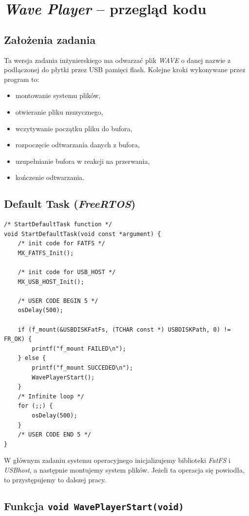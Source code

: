 \documentclass[12pt,a4paper]{article}
\begin{document}
\section{\emph{Wave Player} -- przegląd kodu}

\subsection{Założenia zadania}
Ta wersja zadania inżynierskiego ma odwarzać plik \emph{WAVE} o danej nazwie z podłączonej do płytki przez USB pamięci flash. Kolejne kroki wykonywane przez program to:
\begin{itemize}
 \item montowanie systemu plików,
 \item otwieranie pliku muzycznego,
 \item wczytywanie początku pliku do bufora,
 \item rozpoczęcie odtwarzania danych z bufora,
 \item uzupełnianie bufora w reakcji na przerwania,
 \item kończenie odtwarzania.
\end{itemize}

\subsection{Default Task (\emph{FreeRTOS})}

\begin{lstlisting}
/* StartDefaultTask function */
void StartDefaultTask(void const *argument) {
    /* init code for FATFS */
    MX_FATFS_Init();

    /* init code for USB_HOST */
    MX_USB_HOST_Init();

    /* USER CODE BEGIN 5 */
    osDelay(500);

    if (f_mount(&USBDISKFatFs, (TCHAR const *) USBDISKPath, 0) != FR_OK) {
        printf("f_mount FAILED\n");
    } else {
        printf("f_mount SUCCEDED\n");
        WavePlayerStart();
    }
    /* Infinite loop */
    for (;;) {
        osDelay(500);
    }
    /* USER CODE END 5 */
}
\end{lstlisting}

W głównym zadaniu systemu operacyjnego inicjalizujemy biblioteki \emph{FatFS} i \emph{USBhost}, a następnie montujemy system plików. Jeżeli ta operacja się powiodła, to przystępujemy to dalszej pracy. \newpage

\subsection{Funkcja \texttt{void WavePlayerStart(void)}}
\end{document}
